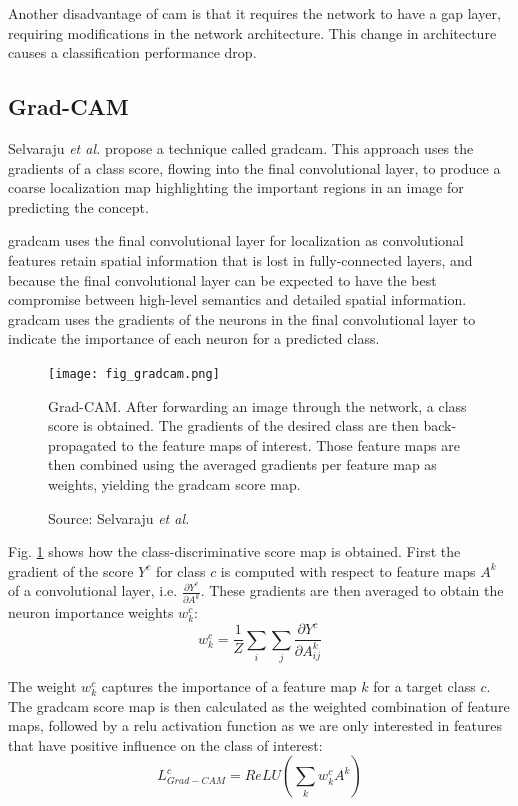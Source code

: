 Another disadvantage of \acrshort{cam} is that it requires the network to have a \acrshort{gap} layer, requiring modifications in the network architecture. This change in architecture causes a classification performance drop.

\subsection{Grad-CAM}
Selvaraju \textit{et al.} \cite{selvaraju2017grad} propose a technique called \acrfull{gradcam}. This approach uses the gradients of a class score, flowing into 
the final convolutional layer, to produce a coarse localization map highlighting the important regions in an image for predicting the concept. 

\acrshort{gradcam} uses the final convolutional layer for localization as convolutional features retain spatial information that is lost in fully-connected layers, and because the final convolutional layer can be expected to have the best compromise between high-level semantics and detailed spatial information. \acrshort{gradcam} uses the gradients of the neurons in the final convolutional layer to indicate the importance of each neuron for a predicted class.

\begin{figure}[ht]
    \begin{center}       
    \texttt{[image: fig\_gradcam.png]}
    \caption[Grad-CAM]{Grad-CAM. After forwarding an image through the network, a class score is obtained. The gradients of the desired class are then back-propagated to the feature maps of interest. Those feature maps are then combined using the averaged gradients per feature map as weights, yielding the \acrshort{gradcam} score map.}
    \caption*{Source: Selvaraju \textit{et al.} \cite{selvaraju2017grad}}
    \label{fig:gradcam}
    \end{center}
\end{figure}
Fig. \ref{fig:gradcam} shows how the class-discriminative score map is obtained. First the gradient of the score $Y^c$ for class $c$ is computed with respect to feature maps $A^k$ of a convolutional layer, i.e. $\frac{\partial{Y^c}}{\partial{A^k}}$. These gradients are then averaged to obtain the neuron importance weights $w_{k}^{c}$:
\begin{equation}
    w_{k}^{c} = \frac{1}{Z}\sum_{i}\sum_{j}\frac{\partial{Y^c}}{\partial{A_{ij}^{k}}}
\end{equation}

The weight $w_{k}^{c}$ captures the importance of a feature map $k$ for a target class $c$. The \acrshort{gradcam} score map is then calculated as the weighted combination of feature maps, followed by a \acrshort{relu} activation function as we are only interested in features that have positive influence on the class of interest:
\begin{equation}
    L_{Grad-CAM}^{c} = ReLU \left( \sum_{k}w_{k}^{c} A^{k} \right)
\end{equation}

